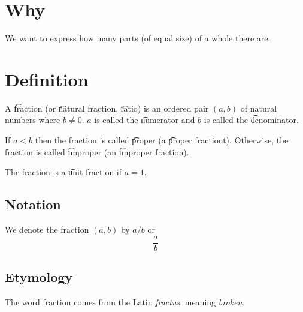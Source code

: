 
\section*{Why}

We want to express how many parts (of equal size) of a whole there are.

\section*{Definition}

A \t{fraction} (or \t{natural fraction}, \t{ratio}) is an ordered pair $(a, b)$ of natural numbers where $b \neq 0$.
$a$ is called the \t{numerator} and $b$ is called the \t{denominator}.

If $a < b$ then the fraction is called \t{proper} (a \t{proper fractiont}).
Otherwise, the fraction is called \t{improper} (an \t{improper fraction}).

The fraction is a \t{unit fraction} if $a = 1$.

\subsection*{Notation}

We denote the fraction $(a, b)$ by $a/b$ or
\[
\frac{a}{b}
\]

\subsection*{Etymology}

The word fraction comes from the Latin \textit{fractus}, meaning \textit{broken}.

\blankpage
